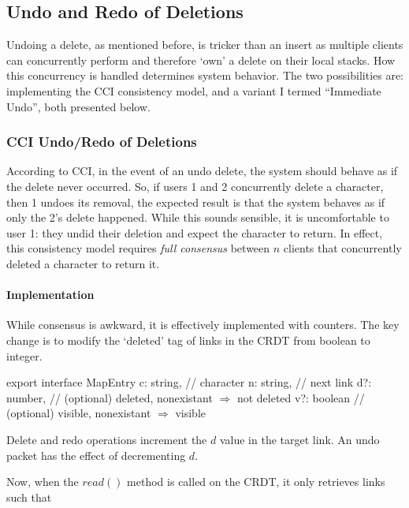 \documentclass[12pt,a4paper,twoside,openright]{report}
\begin{document}
	\subsection{Undo and Redo of Deletions}
		Undoing a delete, as mentioned before, is tricker than an insert as multiple clients can concurrently perform and therefore `own' a delete on their local stacks. How this concurrency is handled determines system behavior. The two possibilities are: implementing the CCI consistency model, and a variant I termed ``Immediate Undo'', both presented below.
		
		\subsubsection{CCI Undo/Redo of Deletions} \label{sec:cciundo}
		According to CCI, in the event of an undo delete, the system should behave as if the delete never occurred. So, if users 1 and 2 concurrently delete a character, then 1 undoes its removal, the expected result is that the system behaves as if only the 2's delete happened. While this sounds sensible, it is uncomfortable to user 1: they undid their deletion and expect the character to return. In effect, this consistency model requires \textit{full consensus} between $n$ clients that concurrently deleted a character to return it.
		
			\paragraph{Implementation}
			While consensus is awkward, it is effectively implemented with counters. The key change is to modify the `deleted' tag of links in the CRDT from boolean to integer.
			
\begin{typescript}
export interface MapEntry {
	c: string,   // character
	n: string,   // next link
	d?: number,  // (optional) deleted, nonexistant $\Rightarrow$ not deleted
	v?: boolean  // (optional) visible, nonexistant $\Rightarrow$ visible
}
\end{typescript}

			Delete and redo operations increment the $d$ value in the target link. An undo packet has the effect of decrementing $d$.
			
			Now, when the $read()$ method is called on the CRDT, it only retrieves links such that
			
\end{document}
